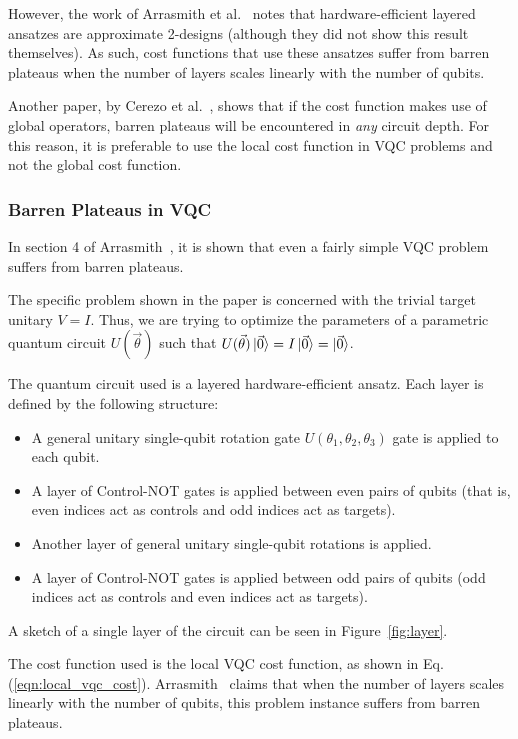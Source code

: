 \documentclass[a4paper,12pt]{article}
\newcommand{\thetas}{\vec{\theta}}
\newenvironment{denseitemize}%
  {\begin{itemize}%
    \setlength{\itemsep}{0pt}}%
  {\end{itemize}}
\begin{document}
However, the work of Arrasmith et al.~\cite{arrasmith_effect_2021} notes that hardware-efficient layered ansatzes are approximate 2-designs (although they did not show this result themselves).
As such, cost functions that use these ansatzes suffer from barren plateaus when the number of layers scales linearly with the number of qubits.

Another paper, by Cerezo et al.~\cite{cerezo_cost_2021}, shows that if the cost function makes use of global operators, barren plateaus will be encountered in \emph{any} circuit depth.
For this reason, it is preferable to use the local cost function in VQC problems and not the global cost function.

\subsubsection{Barren Plateaus in VQC} \label{subsec:vqc_bp}
In section 4 of Arrasmith~\cite{arrasmith_effect_2021}, it is shown that even a fairly simple VQC problem suffers from barren plateaus.

The specific problem shown in the paper is concerned with the trivial target unitary $V = I$.
Thus, we are trying to optimize the parameters of a parametric quantum circuit $U(\thetas)$ such that $U(\thetas)\ket{\vec{0}} = I\ket{\vec{0}} = \ket{\vec{0}}$.

The quantum circuit used is a layered hardware-efficient ansatz.
Each layer is defined by the following structure:
\begin{denseitemize}
    \item A general unitary single-qubit rotation gate $U(\theta_1, \theta_2, \theta_3)$ gate is applied to each qubit.
    \item A layer of Control-NOT gates is applied between even pairs of qubits (that is, even indices act as controls and odd indices act as targets).
    \item Another layer of general unitary single-qubit rotations is applied.
    \item A layer of Control-NOT gates is applied between odd pairs of qubits (odd indices act as controls and even indices act as targets).
\end{denseitemize}
A sketch of a single layer of the circuit can be seen in Figure~\ref{fig:layer}.

The cost function used is the local VQC cost function, as shown in Eq. (\ref{eqn:local_vqc_cost}).
Arrasmith~\cite{arrasmith_effect_2021} claims that when the number of layers scales linearly with the number of qubits, this problem instance suffers from barren plateaus.
\end{document}
